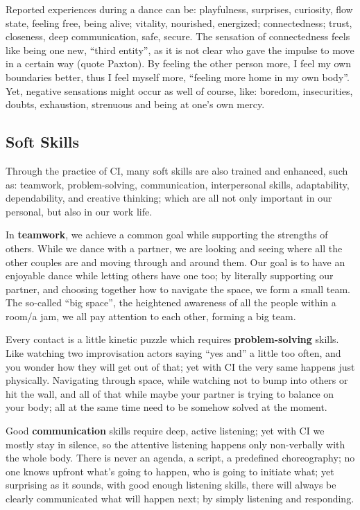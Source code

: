 Reported experiences during a dance can be: playfulness, surprises, curiosity, flow state, feeling free, being alive; vitality, nourished, energized; connectedness; trust, closeness, deep communication, safe, secure.
The sensation of connectedness feels like being one new, ``third entity'', as it is not clear who gave the impulse to move in a certain way (quote Paxton).
By feeling the other person more, I feel my own boundaries better, thus I feel myself more, ``feeling more home in my own body''.
Yet, negative sensations might occur as well of course, like: boredom, insecurities, doubts, exhaustion, strenuous and being at one's own mercy.

\subsection{Soft Skills}\label{subsec:soft-skills}

Through the practice of CI, many soft skills are also trained and enhanced, such as: teamwork, problem-solving, communication, interpersonal skills, adaptability, dependability, and creative thinking; which are all not only important in our personal, but also in our work life.

In \textbf{teamwork}, we achieve a common goal while supporting the strengths of others.
While we dance with a partner, we are looking and seeing where all the other couples are and moving through and around them.
Our goal is to have an enjoyable dance while letting others have one too; by literally supporting our partner, and choosing together how to navigate the space, we form a small team.
The so-called ``big space'', the heightened awareness of all the people within a room/a jam, we all pay attention to each other, forming a big team.

Every contact is a little kinetic puzzle which requires \textbf{problem-solving} skills.
Like watching two improvisation actors saying ``yes and'' a little too often, and you wonder how they will get out of that; yet with CI the very same happens just physically.
Navigating through space, while watching not to bump into others or hit the wall, and all of that while maybe your partner is trying to balance on your body; all at the same time need to be somehow solved at the moment.

Good \textbf{communication} skills require deep, active listening; yet with CI we mostly stay in silence, so the attentive listening happens only non-verbally with the whole body.
There is never an agenda, a script, a predefined choreography; no one knows upfront what's going to happen, who is going to initiate what; yet surprising as it sounds, with good enough listening skills, there will always be clearly communicated what will happen next; by simply listening and responding.

